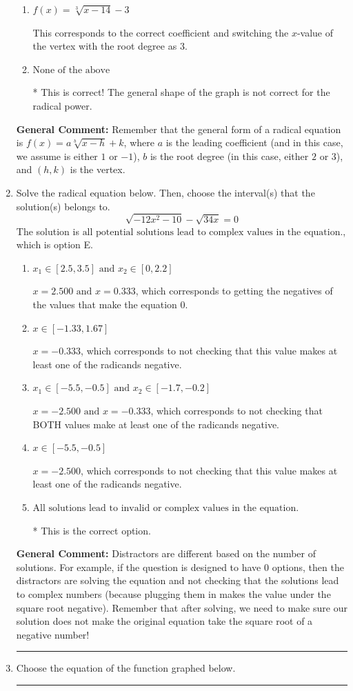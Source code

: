 \documentclass{extbook}[14pt]
\newcommand{\litem}[1]{\item #1

\rule{\textwidth}{0.4pt}}
\begin{document}
\begin{enumerate}
{\begin{enumerate}[label=\Alph*.]
This corresponds to switching the coefficient and having the correct vertex with the root degree as $3$.
\item \( f(x) = \sqrt[3]{x - 14} - 3 \)

This corresponds to the correct coefficient and switching the $x$-value of the vertex with the root degree as $3$.
\item \( \text{None of the above} \)

* This is correct! The general shape of the graph is not correct for the radical power.
\end{enumerate}

\textbf{General Comment:} Remember that the general form of a radical equation is $ f(x) = a \sqrt[b]{x - h} + k$, where $a$ is the leading coefficient (and in this case, we assume is either $1$ or $-1$), $b$ is the root degree (in this case, either $2$ or $3$), and $(h, k)$ is the vertex.
}
\litem{
Solve the radical equation below. Then, choose the interval(s) that the solution(s) belongs to.
\[ \sqrt{-12 x^2 - 10} - \sqrt{34 x} = 0 \]The solution is \( \text{all potential solutions lead to complex values in the equation.} \), which is option E.\begin{enumerate}[label=\Alph*.]
\item \( x_1 \in [2.5, 3.5] \text{ and } x_2 \in [0,2.2] \)

$x = 2.500 \text{ and } x = 0.333$, which corresponds to getting the negatives of the values that make the equation 0.
\item \( x \in [-1.33,1.67] \)

$x = -0.333$, which corresponds to not checking that this value makes at least one of the radicands negative.
\item \( x_1 \in [-5.5, -0.5] \text{ and } x_2 \in [-1.7,-0.2] \)

$x = -2.500 \text{ and } x = -0.333$, which corresponds to not checking that BOTH values make at least one of the radicands negative.
\item \( x \in [-5.5,-0.5] \)

$x = -2.500$, which corresponds to not checking that this value makes at least one of the radicands negative.
\item \( \text{All solutions lead to invalid or complex values in the equation.} \)

* This is the correct option.
\end{enumerate}

\textbf{General Comment:} Distractors are different based on the number of solutions. For example, if the question is designed to have 0 options, then the distractors are solving the equation and not checking that the solutions lead to complex numbers (because plugging them in makes the value under the square root negative). Remember that after solving, we need to make sure our solution does not make the original equation take the square root of a negative number!
}
\litem{
Choose the equation of the function graphed below.

}
\end{enumerate}
\end{document}
